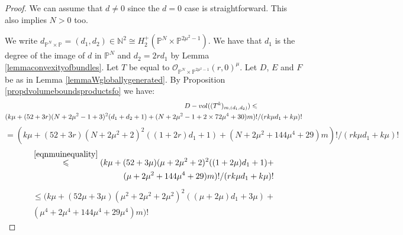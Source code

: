 \documentclass[10pt,a4paper]{amsart}
\newcommand{\Vol}{\textnormal{-vol}}
\newcommand{\bN}{\mathbb{N}}
\newcommand{\bP}{\mathbb{P}}
\newcommand{\calO}{\mathcal{O}}
\newcommand{\frI}{\mathfrak{I}}
\renewcommand{\geq}{\geqslant}
\renewcommand{\leq}{\leqslant}
\begin{document}
\begin{proof}
	We can assume that $d \neq 0$ since the $d=0$ case is straightforward.
	This also implies $N>0$ too.

	We write $d_{\bP^N \times \bP} = (d_1,d_2) \in \bN^2 \cong H_2^+(\bP^N \times \bP^{2\mu^2-1})$.
	We have that $d_1$ is the degree of the image of $d$ in $\bP^N$ and $d_2 = 2rd_1$ by Lemma \ref{lemmaconvexityofbundles}.
	Let $T$ be equal to $\calO_{\bP^N \times \bP^{2\mu^2-1}}(r,0)^{\mu}$.
	Let $D$, $E$ and $F$ be as in Lemma \ref{lemmaWgloballygenerated}.
	By Proposition \ref{propdvolumeboundsproductsfo} we have:
	\begin{equation} \label{eqnbounedsed2222}
		\begin{aligned}
			D\Vol((T^k)_{m,(d_1,d_2)}) \leq                                                 & \\
			(k\mu+(52+3r)(N+2\mu^2-1+3)^2(d_1+d_2+1) + (N+2\mu^2-1+2 \times 72\mu^4 +30)m)! &
			/ (rk\mu d_1 + k\mu)!
		\end{aligned}
	\end{equation}
	\begin{equation}
		=(k\mu+(52+3r)(N+2\mu^2+2)^2((1+2r)d_1+1) + (N+2\mu^2+144\mu^4+29)m)!
		/ (rk\mu d_1 + k\mu)!
	\end{equation}
	\begin{equation}
		\begin{aligned}
			\overset{\textnormal{\eqref{eqnmuinequality}}}{\leq}
			(k\mu+(52+3\mu)(\mu+2\mu^2+2)^2((1+2\mu)d_1+1) + \\ (\mu+2\mu^2+144\mu^4+29)m)!
			/ (rk\mu d_1 + k\mu)!
		\end{aligned}
	\end{equation}
	\begin{equation}
		\begin{aligned}
			\leq
			(k\mu+(52\mu+3\mu)(\mu^2+2\mu^2+2\mu^2)^2((\mu+2\mu)d_1+3\mu) + \\ (\mu^4+2\mu^4+144\mu^4+29\mu^4)m)!

\end{aligned}
\end{equation}
\end{proof}
\end{document}
